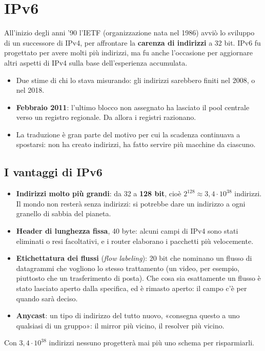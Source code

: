 \section{IPv6}

All'inizio degli anni '90 l'IETF (organizzazione nata nel 1986) avviò lo sviluppo di un successore di IPv4, per
affrontare la \textbf{carenza di indirizzi} a 32 bit. IPv6 fu progettato per avere molti più indirizzi, ma fu anche
l'occasione per aggiornare altri aspetti di IPv4 sulla base dell'esperienza accumulata.

\begin{itemize}
    \item Due stime di chi lo stava misurando: gli indirizzi sarebbero finiti nel 2008, o nel 2018.
    \item \textbf{Febbraio 2011}: l'ultimo blocco non assegnato ha lasciato il pool centrale verso un registro regionale. Da
          allora i registri razionano.
    \item La traduzione è gran parte del motivo per cui la scadenza continuava a spostarsi: non ha creato indirizzi, ha fatto
          servire più macchine da ciascuno.
\end{itemize}


\subsection{I vantaggi di IPv6}

\begin{itemize}
    \item \textbf{Indirizzi molto più grandi}: da 32 a \textbf{128 bit}, cioè $2^{128} \approx 3{,}4\cdot 10^{38}$ indirizzi. Il mondo
          non resterà senza indirizzi: si potrebbe dare un indirizzo a ogni granello di sabbia del pianeta.
    \item \textbf{Header di lunghezza fissa}, 40 byte: alcuni campi di IPv4 sono stati eliminati o resi facoltativi, e i router
          elaborano i pacchetti più velocemente.
    \item \textbf{Etichettatura dei flussi} (\emph{flow labeling}): 20 bit che nominano un flusso di datagrammi che vogliono lo
          stesso trattamento (un video, per esempio, piuttosto che un trasferimento di posta). Che cosa sia esattamente un
          flusso è stato lasciato aperto dalla specifica, ed è rimasto aperto: il campo c'è per quando sarà deciso.
    \item \textbf{Anycast}: un tipo di indirizzo del tutto nuovo, «consegna questo a uno qualsiasi di un gruppo»: il mirror più
          vicino, il resolver più vicino.
\end{itemize}
Con $3{,}4 \cdot 10^{38}$ indirizzi nessuno progetterà mai più uno schema per risparmiarli.

